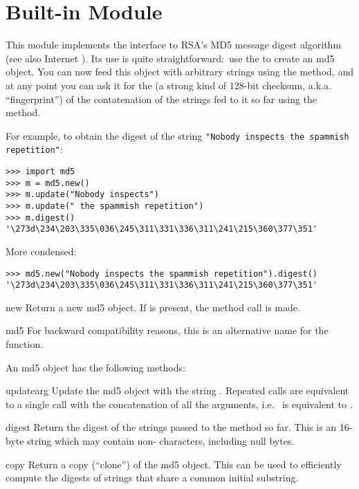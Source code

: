\section{Built-in Module }
\label{module-md5}

This module implements the interface to RSA's MD5 message digest
algorithm (see also Internet ).  Its use is quite
straightforward:\ use the  to create an md5 object.
You can now feed this object with arbitrary strings using the
 method, and at any point you can ask it for the
 (a strong kind of 128-bit checksum,
a.k.a. ``fingerprint'') of the contatenation of the strings fed to it
so far using the  method.

For example, to obtain the digest of the string {\tt"Nobody inspects
the spammish repetition"}:

\bcode\begin{verbatim}
>>> import md5
>>> m = md5.new()
>>> m.update("Nobody inspects")
>>> m.update(" the spammish repetition")
>>> m.digest()
'\273d\234\203\335\036\245\311\331\336\311\241\215\360\377\351'
\end{verbatim}\ecode
%
More condensed:

\bcode\begin{verbatim}
>>> md5.new("Nobody inspects the spammish repetition").digest()
'\273d\234\203\335\036\245\311\331\336\311\241\215\360\377\351'
\end{verbatim}\ecode
%
\renewcommand{\indexsubitem}{(in module md5)}

\begin{funcdesc}{new}{}
Return a new md5 object.  If  is present, the method call
 is made.
\end{funcdesc}

\begin{funcdesc}{md5}{}
For backward compatibility reasons, this is an alternative name for the
 function.
\end{funcdesc}

An md5 object has the following methods:

\renewcommand{\indexsubitem}{(md5 method)}
\begin{funcdesc}{update}{arg}
Update the md5 object with the string .  Repeated calls are
equivalent to a single call with the concatenation of all the
arguments, i.e.\  is equivalent to
.
\end{funcdesc}

\begin{funcdesc}{digest}{}
Return the digest of the strings passed to the 
method so far.  This is an 16-byte string which may contain
non-\ASCII{} characters, including null bytes.
\end{funcdesc}

\begin{funcdesc}{copy}{}
Return a copy (``clone'') of the md5 object.  This can be used to
efficiently compute the digests of strings that share a common initial
substring.
\end{funcdesc}
